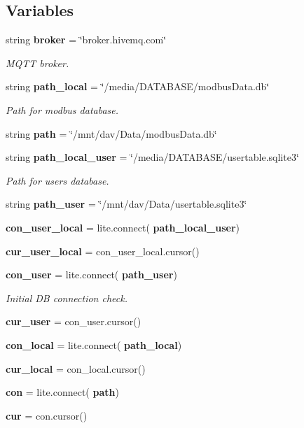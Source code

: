 \subsection*{Variables}
\begin{DoxyCompactItemize}
\item 
string \textbf{ broker} = \char`\"{}broker.\+hivemq.\+com\char`\"{}
\begin{DoxyCompactList}\small\item\em M\+Q\+TT broker. \end{DoxyCompactList}\item 
string \textbf{ path\+\_\+local} = \char`\"{}/media/D\+A\+T\+A\+B\+A\+SE/modbus\+Data.\+db\char`\"{}
\begin{DoxyCompactList}\small\item\em Path for modbus database. \end{DoxyCompactList}\item 
string \textbf{ path} = \char`\"{}/mnt/dav/Data/modbus\+Data.\+db\char`\"{}
\item 
string \textbf{ path\+\_\+local\+\_\+user} = \char`\"{}/media/D\+A\+T\+A\+B\+A\+SE/usertable.\+sqlite3\char`\"{}
\begin{DoxyCompactList}\small\item\em Path for users database. \end{DoxyCompactList}\item 
string \textbf{ path\+\_\+user} = \char`\"{}/mnt/dav/Data/usertable.\+sqlite3\char`\"{}
\item 
\textbf{ con\+\_\+user\+\_\+local} = lite.\+connect(\textbf{ path\+\_\+local\+\_\+user})
\item 
\textbf{ cur\+\_\+user\+\_\+local} = con\+\_\+user\+\_\+local.\+cursor()
\item 
\textbf{ con\+\_\+user} = lite.\+connect(\textbf{ path\+\_\+user})
\begin{DoxyCompactList}\small\item\em Initial DB connection check. \end{DoxyCompactList}\item 
\textbf{ cur\+\_\+user} = con\+\_\+user.\+cursor()
\item 
\textbf{ con\+\_\+local} = lite.\+connect(\textbf{ path\+\_\+local})
\item 
\textbf{ cur\+\_\+local} = con\+\_\+local.\+cursor()
\item 
\textbf{ con} = lite.\+connect(\textbf{ path})
\item 
\textbf{ cur} = con.\+cursor()

\end{DoxyCompactItemize}
